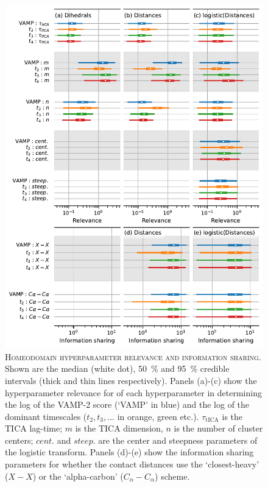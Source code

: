 \documentclass{article}
\begin{document}
\begin{figure}[h]
    \centering
    \includegraphics[height=0.8\textheight]{figures/sensitivities/uvf_sensitivity.pdf}
    \caption{\textsc{Homeodomain hyperparameter relevance and information sharing}. Shown are the  median (white dot), \SI{50}{\percent} and \SI{95}{\percent} credible intervals (thick and thin lines respectively).  Panels (a)-(c) show the hyperparameter relevance for of each hyperparameter in determining the log of the VAMP-2 score (`VAMP' in blue) and the log of the dominant timescales ($t_{2}, t_{3}, ...$ in orange, green etc.). $\tau_{\mathrm{tICA}}$ is the TICA lag-time; $m$ is the TICA dimension, $n$ is the number of cluster centers; $cent.$ and $steep.$ are the center and steepness parameters of the logistic transform. Panels (d)-(e) show the information sharing parameters for whether the contact distances use the `closest-heavy' ($X-X$) or the `alpha-carbon' ($C_{\alpha}-C_{\alpha}$) scheme.  }
    \label{fig:uvf_sense}
\end{figure}
\end{document}
